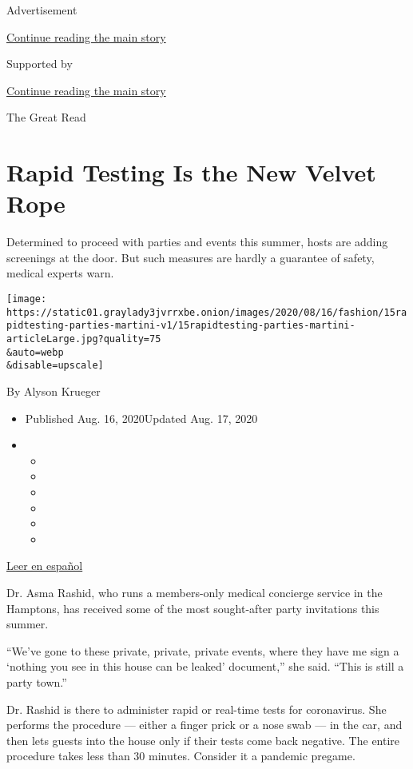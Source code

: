Advertisement

\protect\hyperlink{after-top}{Continue reading the main story}

Supported by

\protect\hyperlink{after-sponsor}{Continue reading the main story}

The Great Read

\hypertarget{rapid-testing-is-the-new-velvet-rope}{%
\section{Rapid Testing Is the New Velvet
Rope}\label{rapid-testing-is-the-new-velvet-rope}}

Determined to proceed with parties and events this summer, hosts are
adding screenings at the door. But such measures are hardly a guarantee
of safety, medical experts warn.

\texttt{[image: https://static01.graylady3jvrrxbe.onion/images/2020/08/16/fashion/15rapidtesting-parties-martini-v1/15rapidtesting-parties-martini-articleLarge.jpg?quality=75\\\&auto=webp\\\&disable=upscale]}

By Alyson Krueger

\begin{itemize}
\item
  Published Aug. 16, 2020Updated Aug. 17, 2020
\item
  \begin{itemize}
  \item
  \item
  \item
  \item
  \item
  \item
  \end{itemize}
\end{itemize}

\href{https://www.nytimes3xbfgragh.onion/es/2020/08/18/espanol/estilos-de-vida/prueba-rapida-coronavirus.html}{Leer
en español}

Dr. Asma Rashid, who runs a members-only medical concierge service in
the Hamptons, has received some of the most sought-after party
invitations this summer.

``We've gone to these private, private, private events, where they have
me sign a `nothing you see in this house can be leaked' document,'' she
said. ``This is still a party town.''

Dr. Rashid is there to administer rapid or real-time tests for
coronavirus. She performs the procedure --- either a finger prick or a
nose swab --- in the car, and then lets guests into the house only if
their tests come back negative. The entire procedure takes less than 30
minutes. Consider it a pandemic pregame.

